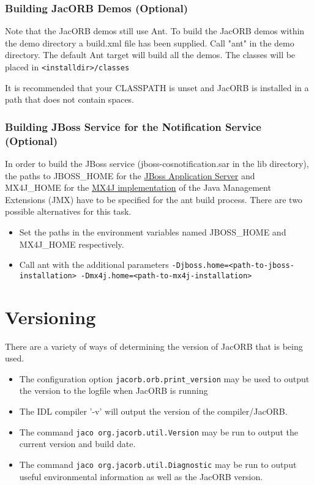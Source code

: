 \subsubsection{Building JacORB Demos (Optional)}
Note that the JacORB demos still use Ant. To build the JacORB demos within the
demo directory a build.xml file has been supplied. Call "ant" in the demo directory.
The default Ant target will build all the demos. The classes will be placed
in {\tt <installdir>/classes}

It is recommended that your CLASSPATH is unset and JacORB is installed in a path that does
not contain spaces.

\subsubsection{Building JBoss Service for the Notification Service (Optional)}
In order to build the JBoss service (jboss-cosnotification.sar in the lib
directory), the paths to JBOSS\_HOME for the
\href{http://www.jboss.org/jbossas}{JBoss Application Server} and MX4J\_HOME
for the \href{http://mx4j.sourceforge.net}{MX4J implementation}
 of the Java Management Extensions (JMX) have to be specified for the ant build
process. There are two possible alternatives for this task.
\begin{itemize}
\item Set the paths in the environment variables named JBOSS\_HOME and MX4J\_HOME respectively.
\item Call ant with the additional parameters {\tt -Djboss.home=<path-to-jboss-installation> -Dmx4j.home=<path-to-mx4j-installation>}
\end{itemize}


\section{Versioning}
There are a variety of ways of determining the version of JacORB that is being used.
\begin{itemize}
\item The configuration option {\tt jacorb.orb.print\_version} may be used to output the version to the logfile when JacORB is running
\item The IDL compiler '-v' will output the version of the compiler/JacORB.
\item The command {\tt jaco org.jacorb.util.Version} may be run to output the current version and build date.
\item The command {\tt jaco org.jacorb.util.Diagnostic} may be run to output useful environmental information as well as the JacORB version.
\end{itemize}

